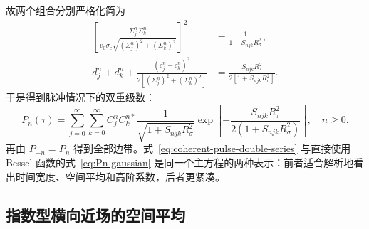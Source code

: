 故两个组合分别严格化简为
\begin{align}
\left[
\frac{\Sigma_j^n\Sigma_k^n}
{v_0\sigma_{\mathrm e}\sqrt{(\Sigma_j^n)^2+(\Sigma_k^n)^2}}
\right]^2
&=\frac{1}{1+S_{njk}R_\sigma^2},
\label{eq:pref_simplify}\\
d_j^n+d_k^n+
\frac{(c_j^n-c_k^n)^2}
{2[(\Sigma_j^n)^2+(\Sigma_k^n)^2]}
&=\frac{S_{njk}R_\tau^2}
{2[1+S_{njk}R_\sigma^2]}.
\label{eq:exp_simplify}
\end{align}
于是得到脉冲情况下的双重级数：
\begin{equation}
\boxed{
P_n(\tau)=
\sum_{j=0}^{\infty}\sum_{k=0}^{\infty}
C_j^nC_k^{n*}
\frac{1}{\sqrt{1+S_{njk}R_\sigma^2}}
\exp\!\left[
-\frac{S_{njk}R_\tau^2}
{2(1+S_{njk}R_\sigma^2)}
\right],\quad n\ge0.}
\label{eq:coherent-pulse-double-series}
\end{equation}
再由 \(P_{-n}=P_n\) 得到全部边带。式~\eqref{eq:coherent-pulse-double-series} 与直接使用 Bessel 函数的式~\eqref{eq:Pn-gaussian} 是同一个主方程的两种表示：前者适合解析地看出时间宽度、空间平均和高阶系数，后者更紧凑。


\subsection{指数型横向近场的空间平均}

